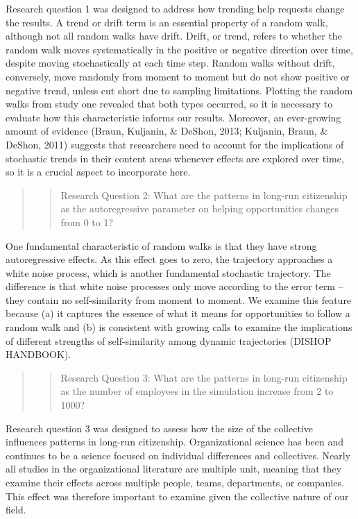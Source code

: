 \documentclass[english,,man]{apa6}
\theoremstyle{definition}
\theoremstyle{definition}
\theoremstyle{definition}
\theoremstyle{remark}
\begin{document}
Research question 1 was designed to address how trending help requests
change the results. A trend or drift term is an essential property of a
random walk, although not all random walks have drift. Drift, or trend,
refers to whether the random walk moves systematically in the positive
or negative direction over time, despite moving stochastically at each
time step. Random walks without drift, conversely, move randomly from
moment to moment but do not show positive or negative trend, unless cut
short due to sampling limitations. Plotting the random walks from study
one revealed that both types occurred, so it is necessary to evaluate
how this characteristic informs our results. Moreover, an ever-growing
amount of evidence (Braun, Kuljanin, \& DeShon, 2013; Kuljanin, Braun,
\& DeShon, 2011) suggests that researchers need to account for the
implications of stochastic trends in their content areas whenever
effects are explored over time, so it is a crucial aspect to incorporate
here.

\begin{quote}
\begin{quote}
Research Question 2: What are the patterns in long-run citizenship as
the autoregressive parameter on helping opportunities changes from 0 to
1?
\end{quote}
\end{quote}

One fundamental characteristic of random walks is that they have strong
autoregressive effects. As this effect goes to zero, the trajectory
approaches a white noise process, which is another fundamental
stochastic trajectory. The difference is that white noise processes only
move according to the error term -- they contain no self-similarity from
moment to moment. We examine this feature because (a) it captures the
essence of what it means for opportunities to follow a random walk and
(b) is consistent with growing calls to examine the implications of
different strengths of self-similarity among dynamic trajectories
(DISHOP HANDBOOK).

\begin{quote}
\begin{quote}
Research Question 3: What are the patterns in long-run citizenship as
the number of employees in the simulation increase from 2 to 1000?
\end{quote}
\end{quote}

Research question 3 was designed to assess how the size of the
collective influences patterns in long-run citizenship. Organizational
science has been and continues to be a science focused on individual
differences and collectives. Nearly all studies in the organizational
literature are multiple unit, meaning that they examine their effects
across multiple people, teams, departments, or companies. This effect
was therefore important to examine given the collective nature of our
field.
\end{document}
